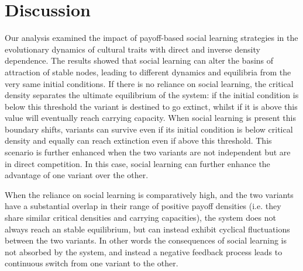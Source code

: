 \documentclass[review,authoryear]{elsarticle}
\begin{document}
\section{Discussion}

Our analysis examined the impact of payoff-based social learning strategies in the evolutionary dynamics of cultural traits with direct and inverse density dependence. The results showed that social learning can alter the basins of attraction of stable nodes, leading to different dynamics and equilibria from the very same initial conditions. If there is no reliance on social learning, the critical density separates the ultimate equilibrium of the system: if the initial condition is below this threshold the variant is destined to go extinct, whilst if it is above this value will eventually reach carrying capacity. When social learning is present this boundary shifts, variants can survive even if its initial condition is below critical density and equally can reach extinction even if above this threshold. This scenario is further enhanced when the two variants are not independent but are in direct competition. In this case, social learning can further enhance the advantage of one variant over the other. 

When the reliance on social learning is comparatively high, and the two variants have a substantial overlap in their range of positive payoff densities (i.e. they share similar critical densities and carrying capacities), the system does not always reach an stable equilibrium, but can instead exhibit cyclical fluctuations between the two variants. In other words the consequences of social learning is not absorbed by the system, and instead a negative feedback process leads to continuous switch from one variant to the other. 



\end{document}
